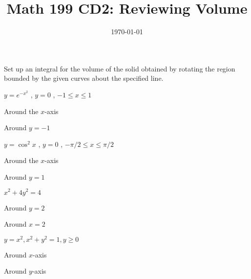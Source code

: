 
\usepackage{fullpage,amsmath,amssymb,amsthm}

\newcommand{\D}{\displaystyle}

\title{Math 199 CD2: Reviewing Volume}
\date{\today}




\maketitle
\be
	\item Set up an integral for the volume of the solid obtained by rotating the region bounded by the given curves about the specified line.
	\be
		\item $y=e^{-x^2}$ , $y = 0$ , $-1\leq x \leq 1$ 
		\be
			\item Around the $x$-axis
			\vskip 3cm
			\item Around $y=-1$
			\vskip 3cm 
		\ee

		\item $y=\cos^2x$ , $y = 0$ , $	-\pi/2 \leq x \leq \pi/2$ 
		\be
			\item Around the $x$-axis
			\vskip 3cm
			\item Around $y=1$
			\vskip 3cm 
		\ee

		\item $x^2+4y^2=4$  
		\be
			\item Around $y=2$
			\vskip 3cm
			\item Around $x=2$
			\vskip 3cm 
		\ee

		\item $y=x^2, x^2+y^2=1, y\geq 0$  
		\be
			\item Around $x$-axis
			\vskip 3cm
			\item Around $y$-axis
			\vskip 3cm 
		\ee
	\ee 
\ee

